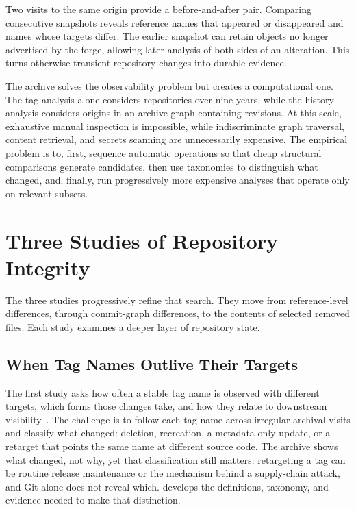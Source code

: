 \label{subsec:intro-obj-histories}%
Two visits to the same origin provide a before-and-after pair.
Comparing consecutive snapshots reveals reference names that appeared or disappeared and names whose targets differ.
The earlier snapshot can retain objects no longer advertised by the forge, allowing later analysis of both sides of an alteration.
This turns otherwise transient repository changes into durable evidence.

\label{subsec:intro-obj-secrets}%
The archive solves the observability problem but creates a computational one.
The tag analysis alone considers \OriginsWithTagsShort repositories over nine years, while the history analysis considers \OriginsTwoVisitsOrMoreShort origins in an archive graph containing \SWHRevisionsShort revisions.
At this scale, exhaustive manual inspection is impossible, while indiscriminate graph traversal, content retrieval, and secrets scanning are unnecessarily expensive.
The empirical problem is to, first, sequence automatic operations so that cheap structural comparisons generate candidates, then use taxonomies to distinguish what changed, and, finally, run progressively more expensive analyses that operate only on relevant subsets.

\section{Three Studies of Repository Integrity}
\label{sec:intro-rqs}

The three studies progressively refine that search.
They move from reference-level differences, through commit-graph differences, to the contents of selected removed files.
Each study examines a deeper layer of repository state.

\subsection{When Tag Names Outlive Their Targets}
\label{subsec:intro-rq-tags}

The first study asks how often a stable tag name is observed with different targets, which forms those changes take, and how they relate to downstream visibility~\cite{rapaport2026tagalterations}.
The challenge is to follow each tag name across irregular archival visits and classify what changed: deletion, recreation, a metadata-only update, or a retarget that points the same name at different source code.
The archive shows what changed, not why, yet that classification still matters: retargeting a tag can be routine release maintenance or the mechanism behind a supply-chain attack, and Git alone does not reveal which.
 develops the definitions, taxonomy, and evidence needed to make that distinction.

